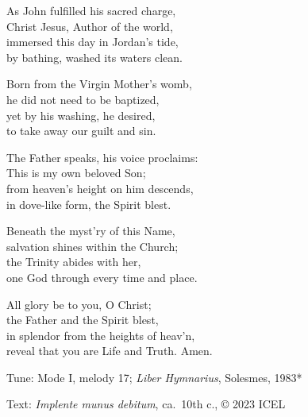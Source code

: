 \hymn

\settowidth{\versewidth}{reveal that you are Life and Truth. Amen.}

\begin{hymnverse}%
As John fulfilled his sacred charge,\\
Christ Jesus, Author of the world,\\
immersed this day in Jordan’s tide,\\
by bathing, washed its waters clean.

Born from the Virgin Mother’s womb,\\
he did not need to be baptized,\\
yet by his washing, he desired,\\
to take away our guilt and sin.

The Father speaks, his voice proclaims:\\
This is my own beloved Son;\\
from heaven’s height on him descends,\\
in dove-like form, the Spirit blest.

Beneath the myst’ry of this Name,\\
salvation shines within the Church;\\
the Trinity abides with her,\\
one God through every time and place.

All glory be to you, O Christ;\\
the Father and the Spirit blest,\\
in splendor from the heights of heav’n,\\
reveal that you are Life and Truth. Amen.
\end{hymnverse}

\begin{hymnsource}
Tune: Mode I, melody 17; \emph{Liber Hymnarius}, Solesmes, 1983*

Text: \emph{Implente munus debitum}, ca.\ 10th c., © 2023 ICEL
\end{hymnsource}
